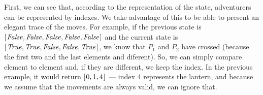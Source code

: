 \documentclass[a4paper]{article}
\newcommand{\Conid}[1]{\mathit{#1}}
\begin{document}
First, we can see that, according to the representation of the state, adventurers can be represented by indexes. We take advantage of this to be able to present an elegant trace of the moves. For example, if the previous state is \ensuremath{[\mskip1.5mu \Conid{False},\Conid{False},\Conid{False},\Conid{False},\Conid{False}\mskip1.5mu]} and the current state is \ensuremath{[\mskip1.5mu \Conid{True},\Conid{True},\Conid{False},\Conid{False},\Conid{True}\mskip1.5mu]}, we know that \ensuremath{P_1 } and \ensuremath{P_2 } have crossed (because the first two and the last elements and diferent). So, we can simply compare element to element and, if they are different, we keep the index. In the previous example, it would return \ensuremath{[\mskip1.5mu \mathrm{0},\mathrm{1},\mathrm{4}\mskip1.5mu]} --- index 4 represents the lantern, and because we assume that the movements are always valid, we can ignore that.
\end{document}

